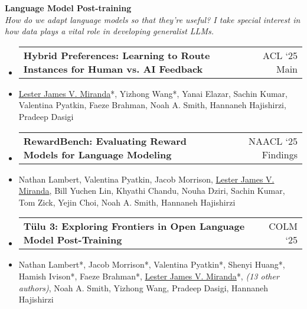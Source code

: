 \documentclass[a4paper,11pt]{article}
\makeatletter
\newcommand{\resumeItem}[1]{
  \item\small{
    {#1 \vspace{-2pt}}
  }
}
\newcommand{\resumeProjectHeading}[2]{
    \item
    \begin{tabular*}{0.97\textwidth}{l@{\extracolsep{\fill}}r}
      \small#1 & #2 \\
    \end{tabular*}\vspace{-7pt}
}
\newcommand{\resumeSubHeadingListStart}{\begin{itemize}[leftmargin=0.15in, label={}]}
\newcommand{\resumeSubHeadingListEnd}{\end{itemize}}
\makeatother
\begin{document}
\vspace{1em}
\textbf{Language Model Post-training}\\
\textit{How do we adapt language models so that they're useful? I take special interest in how data plays a vital role in developing generalist LLMs.}
\resumeSubHeadingListStart
\resumeProjectHeading
{\textbf{Hybrid Preferences: Learning to Route Instances for Human vs. AI Feedback}}{\small ACL `25 Main}
\resumeItem{\underline{Lester James V. Miranda}*, Yizhong Wang*, Yanai Elazar, Sachin Kumar, Valentina Pyatkin, Faeze Brahman, Noah A. Smith, Hannaneh Hajishirzi, Pradeep Dasigi}
\resumeProjectHeading
{\textbf{RewardBench: Evaluating Reward Models for Language Modeling}}{\small NAACL `25 Findings}
\resumeItem{Nathan Lambert, Valentina Pyatkin, Jacob Morrison, \underline{Lester James V. Miranda}, Bill Yuchen Lin, Khyathi Chandu, Nouha Dziri, Sachin Kumar, Tom Zick, Yejin Choi, Noah A. Smith, Hannaneh Hajishirzi}
\resumeProjectHeading
{\textbf{T\"ulu 3: Exploring Frontiers in Open Language Model Post-Training}}{\small COLM `25}
\resumeItem{Nathan Lambert*, Jacob Morrison*, Valentina Pyatkin*, Shenyi Huang*, Hamish Ivison*, Faeze Brahman*, \underline{Lester James V. Miranda}*, \textit{(13 other authors)}, Noah A. Smith, Yizhong Wang, Pradeep Dasigi, Hannaneh Hajishirzi}
\resumeSubHeadingListEnd
\end{document}
